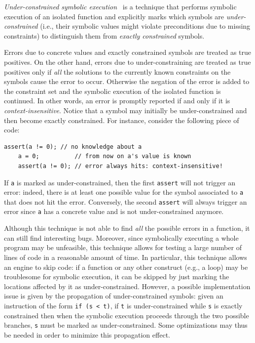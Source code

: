 {\em Under-constrained symbolic execution}~\cite{ED-ISSTA07} is a technique that performs symbolic execution of an isolated function and explicitly marks which symbols are {\em under-constrained} (i.e., their symbolic values might violate preconditions due to missing constraints) to distinguish them from {\em exactly constrained} symbols.

Errors due to concrete values and exactly constrained symbols are treated as true positives. On the other hand, errors due to under-constraining are treated as true positives only if {\em all} the solutions to the currently known constraints on the symbols cause the error to occur. Otherwise the negation of the error is added to the constraint set and the symbolic execution of the isolated function is continued. In other words, an error is  promptly reported if and only if it is {\em context-insensitive}. Notice that a symbol may initially be under-constrained and then become exactly constrained. For instance, consider the following piece of code:

    \begin{lstlisting}[basicstyle=\ttfamily\small]
    assert(a != 0); // no knowledge about a
    a = 0;          // from now on a's value is known
    assert(a != 0); // error always hits: context-insensitive! 
    \end{lstlisting}

If {\tt a} is marked as under-constrained, then the first {\tt assert} will not trigger an error: indeed, there is at least one possible value for the symbol associated to {\tt a} that does not hit the error. Conversely, the second {\tt assert} will always trigger an error since {\tt a} has a concrete value and is not under-constrained anymore.

Although this technique is not able to find {\em all} the possible errors in a function, it can still find interesting bugs. Moreover, since symbolically executing a whole program may be unfeasible, this technique allows for testing a large number of lines of code in a reasonable amount of time. In particular, this technique allows an engine to skip code: if a function or any other construct (e.g., a loop) may be troublesome for symbolic execution, it can be skipped by just marking the locations affected by it as under-constrained. However, a possible implementation issue is given by the propagation of under-constrained symbols: given an instruction of the form {\tt if (s < t)}, if {\tt t} is under-constrained while {\tt s} is exactly constrained then when the symbolic execution proceeds through the two possible branches, {\tt s} must be marked as under-constrained. Some optimizations may thus be needed in order to minimize this propagation effect.
\fi

